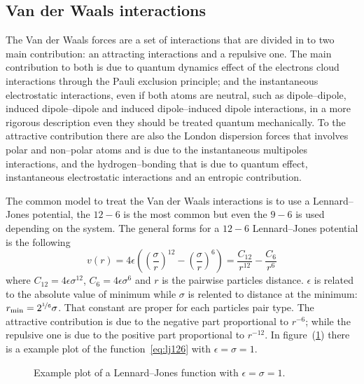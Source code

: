 \subsection{Van der Waals interactions}
The Van der Waals forces are a set of interactions that are divided in to two main contribution: an attracting interactions and a repulsive one. The main contribution to both is due to quantum dynamics effect of the electrons cloud interactions through the Pauli exclusion principle; and the instantaneous electrostatic interactions, even if both atoms are neutral, such as dipole--dipole, induced dipole--dipole and induced dipole--induced dipole interactions, in a more rigorous description even they should be treated quantum mechanically. To the attractive contribution there are also the London dispersion forces that involves polar and non--polar atoms and is due to the instantaneous multipoles interactions, and the hydrogen--bonding that is due to quantum effect, instantaneous electrostatic interactions and an entropic contribution.

The common model to treat the Van der Waals interactions is to use a Lennard--Jones potential, the $12-6$ is the most common but even the $9-6$ is used depending on the system. The general forms for a $12-6$ Lennard--Jones potential is the following
\begin{equation}
	v(r) = 4\epsilon\left ( \left ( \frac{\sigma}{r}\right )^{12}  - \left ( \frac{\sigma}{r} \right )^6 \right ) = \frac{C_{12}}{r^{12}} - \frac{C_{6}}{r^{6}}
	\label{eq:lj126}
\end{equation}
where $C_{12} = 4\epsilon\sigma^{12}$, $C_{6} = 4\epsilon\sigma^{6}$ and $r$ is the pairwise particles distance. $\epsilon$ is related to the absolute value of minimum while $\sigma$ is relented to distance at the minimum: $r_{\text{min}} = 2^{\nicefrac{1}{6}}\sigma$. That constant are proper for each particles pair type. The attractive contribution is due to the negative part proportional to $r^{-6}$; while the repulsive one is due to the positive part proportional to $r^{-12}$. In figure~(\ref{fig:LG12511}) there is a example plot of the function~\eqref{eq:lj126} with $\epsilon = \sigma = 1$.
\begin{figure}[!ht]
\centering
	\caption{Example plot of a Lennard--Jones function with $\epsilon = \sigma = 1$.}
	\label{fig:LG12511}
\end{figure}


